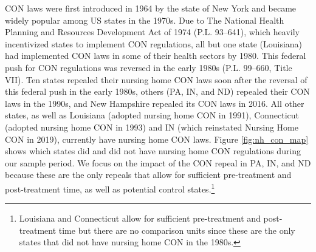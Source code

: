 \documentclass[../Main.tex]{subfiles}
\begin{document}
CON laws were first introduced in 1964 by the state of New York and became widely popular among US states in the 1970s. Due to The National Health Planning and Resources Development Act of 1974 (P.L. 93–641), which heavily incentivized states to implement CON regulations, all but one state (Louisiana) had implemented CON laws in some of their health sectors by 1980. This federal push for CON regulations was reversed in the early 1980s (P.L. 99–660, Title VII). Ten states repealed their nursing home CON laws soon after the reversal of this federal push in the early 1980s, others (PA, IN, and ND) repealed their CON laws in the 1990s, and New Hampshire repealed its CON laws in 2016. All other states, as well as Louisiana (adopted nursing home CON in 1991), Connecticut (adopted nursing home CON in 1993) and IN (which reinstated Nursing Home CON in 2019), currently have nursing home CON laws. Figure \ref{fig:nh_con_map} shows which states did and did not have nursing home CON regulations during our sample period. We focus on the impact of the CON repeal in PA, IN, and ND because these are the only repeals that allow for sufficient pre-treatment and post-treatment time, as well as potential control states.\footnote{Louisiana and Connecticut allow for sufficient pre-treatment and post-treatment time but there are no comparison units since these are the only states that did not have nursing home CON in the 1980s.}
\end{document}
